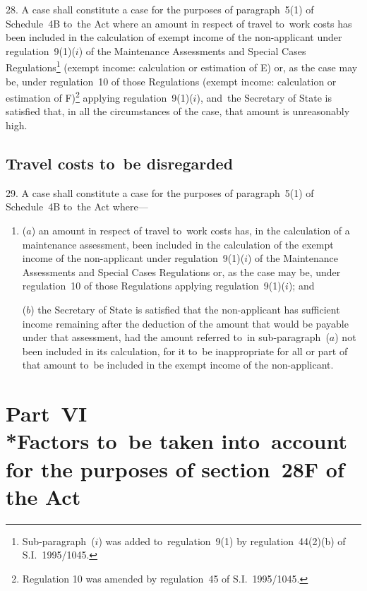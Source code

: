 \documentclass[12pt,a4paper]{article}
\begin{document}
28. A case shall constitute a case for the
purposes of paragraph~5(1) of Schedule~4B to~the Act where an amount in respect
of travel to~work costs has been included in the calculation of exempt income of
the non-applicant under regulation~9(1)($i$) of the Maintenance Assessments and
Special Cases Regulations\footnote{\frenchspacing Sub-paragraph~($i$) was added to~regulation~9(1) by regulation~44(2)(b) of S.I.~1995/1045.} (exempt income: calculation or estimation of E)
or, as the case may be, under regulation~10 of those Regulations (exempt income:
calculation or estimation of F)\footnote{\frenchspacing Regulation 10 was amended by regulation~45 of S.I.~1995/1045.} applying regulation~9(1)($i$), and~the
Secretary of State is satisfied that, in all the circumstances of the case, that
amount is unreasonably high.

\subsection[29. Travel costs to~be disregarded]{Travel costs to~be disregarded}

29. A case shall constitute a case for the
purposes of paragraph~5(1) of Schedule~4B to~the Act where—
\begin{enumerate}\item[]
($a$) an amount in respect of travel to~work costs has, in the calculation of a
maintenance assessment, been included in the calculation of the exempt income of
the non-applicant under regulation~9(1)($i$) of the Maintenance Assessments and
Special Cases Regulations or, as the case may be, under regulation~10 of those
Regulations applying regulation~9(1)($i$); and

($b$) the Secretary of State is satisfied that the non-applicant has sufficient
income remaining after the deduction of the amount that would be payable under
that assessment, had the amount referred to~in sub-paragraph~($a$) not been
included in its calculation, for it to~be inappropriate for all or part of that
amount to~be included in the exempt income of the non-applicant.
\end{enumerate}

\section[Part~VI --- Factors to~be taken into~account for the purposes of section~28F of the Act]{Part~VI\\*Factors to~be taken into~account for the purposes of section~28F of the Act}
\end{document}
